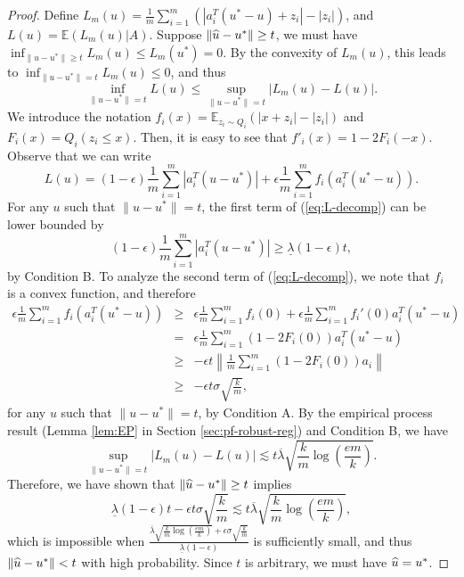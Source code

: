 \begin{proof}
Define $L_m(u)=\frac{1}{m}\sum_{i=1}^m(|a_i^T(u^*-u)+z_i|-|z_i|)$, and $L(u)=\mathbb{E}(L_m(u)|A)$. Suppose $\|\widehat{u}-u^*\|\geq t$, we must have $\inf_{\|u-u^*\|\geq t}L_m(u)\leq L_m(u^*)=0$. By the convexity of $L_m(u)$, this leads to $\inf_{\|u-u^*\|= t}L_m(u)\leq 0$, and thus
$$\inf_{\|u-u^*\|=t}L(u)\leq \sup_{\|u-u^*\|=t}|L_m(u)-L(u)|.$$
We introduce the notation $f_i(x)=\mathbb{E}_{z_i\sim Q_i}(|x+z_i|-|z_i|)$ and $F_i(x)=Q_i(z_i\leq x)$. Then, it is easy to see that $f'_i(x)=1-2F_i(-x)$. Observe that we can write
\begin{equation}
L(u)=(1-\epsilon)\frac{1}{m}\sum_{i=1}^m|a_i^T(u-u^*)| + \epsilon\frac{1}{m}\sum_{i=1}^mf_i(a_i^T(u^*-u)). \label{eq:L-decomp}
\end{equation}
For any $u$ such that $\|u-u^*\|=t$, the first term of (\ref{eq:L-decomp}) can be lower bounded by
$$(1-\epsilon)\frac{1}{m}\sum_{i=1}^m|a_i^T(u-u^*)| \geq \underline{\lambda}(1-\epsilon)t,$$
by Condition B. To analyze the second term of (\ref{eq:L-decomp}), we note that $f_i$ is a convex function, and therefore
\begin{eqnarray*}
\epsilon\frac{1}{m}\sum_{i=1}^mf_i(a_i^T(u^*-u)) &\geq& \epsilon\frac{1}{m}\sum_{i=1}^mf_i(0) + \epsilon\frac{1}{m}\sum_{i=1}^mf_i'(0)a_i^T(u^*-u) \\
&=& \epsilon\frac{1}{m}\sum_{i=1}^m\left(1-2F_i(0)\right)a_i^T(u^*-u) \\
&\geq& -\epsilon t\left\|\frac{1}{m}\sum_{i=1}^m\left(1-2F_i(0)\right)a_i\right\| \\
&\geq& -\epsilon t\sigma\sqrt{\frac{k}{m}},
\end{eqnarray*}
for any $u$ such that $\|u-u^*\|=t$, by Condition A. By the empirical process result (Lemma \ref{lem:EP} in Section \ref{sec:pf-robust-reg}) and Condition B, we have
\begin{equation}
\sup_{\|u-u^*\|= t}|L_m(u)-L(u)| \lesssim t\overline{\lambda}\sqrt{\frac{k}{m}\log\left(\frac{em}{k}\right)}. \label{eq:upper-EP}
\end{equation}
Therefore, we have shown that $\|\widehat{u}-u^*\|\geq t$ implies
$$\underline{\lambda}(1-\epsilon)t - \epsilon t\sigma\sqrt{\frac{k}{m}} \lesssim t\overline{\lambda}\sqrt{\frac{k}{m}\log\left(\frac{em}{k}\right)},$$
which is impossible when $\frac{\overline{\lambda}\sqrt{\frac{k}{m}\log\left(\frac{em}{k}\right)}+\epsilon\sigma\sqrt{\frac{k}{m}}}{\underline{\lambda}(1-\epsilon)}$ is sufficiently small, and thus $\|\widehat{u}-u^*\|< t$ with high probability. Since $t$ is arbitrary, we must have $\widehat{u}=u^*$.
\end{proof}

